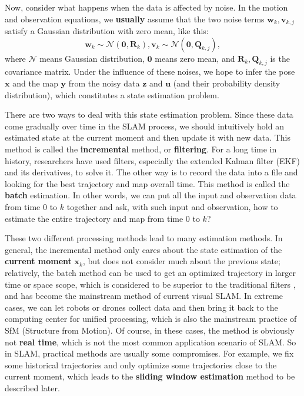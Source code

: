 Now, consider what happens when the data is affected by noise. In the motion and observation equations, we \textbf {usually} assume that the two noise terms $ \mathbf {w} _k, \mathbf {v} _ {k, j} $ satisfy a Gaussian distribution with zero mean, like this:
\begin{equation}
{\mathbf{w}_k} \sim \mathcal{N}\left( {\mathbf{0},{\mathbf{R}_k}} \right),{\mathbf{v}_k} \sim \mathcal{N}\left( {\mathbf{0},{{{\mathbf{Q}}}_{k,j}}} \right),
\end{equation}
where $ \mathcal {N} $ means Gaussian distribution, $ \mathbf{0} $ means zero mean, and $ \mathbf {R} _k, \mathbf {Q} _ {k, j} $ is the covariance matrix. Under the influence of these noises, we hope to infer the pose $ \mathbf {x} $ and the map $ \mathbf {y} $ from the noisy data $ \mathbf {z} $ and $ \mathbf {u} $ (and their probability density distribution), which constitutes a state estimation problem.

There are two ways to deal with this state estimation problem. Since these data come gradually over time in the SLAM process, we should intuitively hold an estimated state at the current moment and then update it with new data. This method is called the \textbf {incremental} method, or \textbf{filtering}. For a long time in history, researchers have used filters, especially the extended Kalman filter (EKF) and its derivatives, to solve it. The other way is to record the data into a file and looking for the best trajectory and map overall time. This method is called the \textbf {batch} estimation. In other words, we can put all the input and observation data from time 0 to $ k $ together and ask, with such input and observation, how to estimate the entire trajectory and map from time 0 to $ k $?


These two different processing methods lead to many estimation methods. In general, the incremental method only cares about the state estimation of the \textbf {current moment} $ \mathbf {x} _k $, but does not consider much about the previous state; relatively, the batch method can be used to get an optimized trajectory in larger time or space scope, which is considered to be superior to the traditional filters \textsuperscript {\cite {Strasdat2012}}, and has become the mainstream method of current visual SLAM. In extreme cases, we can let robots or drones collect data and then bring it back to the computing center for unified processing, which is also the mainstream practice of SfM (Structure from Motion). Of course, in these cases, the method is obviously not \textbf {real time}, which is not the most common application scenario of SLAM. So in SLAM, practical methods are usually some compromises. For example, we fix some historical trajectories and only optimize some trajectories close to the current moment, which leads to the \textbf {sliding window estimation} method to be described later.

